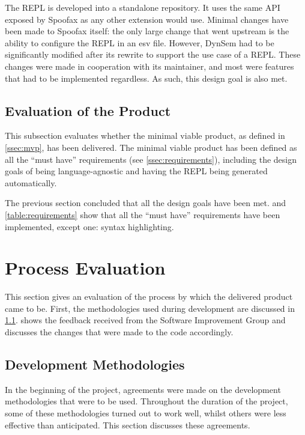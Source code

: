 The REPL is developed into a standalone repository. It uses the same API exposed
by Spoofax as any other extension would use. Minimal changes have been made to
Spoofax itself: the only large change that went upstream is the ability to
configure the REPL in an esv file. However, DynSem had to be significantly
modified after its rewrite to support the use case of a REPL. These changes were
made in cooperation with its maintainer, and most were features that had to be
implemented regardless. As such, this design goal is also met.

\subsection{Evaluation of the Product}
\label{ssec:eval-product}

This subsection evaluates whether the minimal viable product, as defined in
\cref{ssec:mvp}, has been delivered. The minimal viable product has been defined
as all the ``must have'' requirements (see \cref{ssec:requirements}), including
the design goals of being language-agnostic and having the REPL being generated
automatically.

The previous section concluded that all the design goals have been met.
 and \cref{table:requirements} show that all the
``must have'' requirements have been implemented, except one: syntax
highlighting.


\section{Process Evaluation}
\label{sec:process-evaluation}

This section gives an evaluation of the process by which the delivered product
came to be. First, the methodologies used during development are discussed in
\cref{ssec:dev-meth}.  shows the feedback received from the
Software Improvement Group and discusses the changes that were made to the code
accordingly.

\subsection{Development Methodologies}
\label{ssec:dev-meth}

In the beginning of the project, agreements were made on the development
methodologies that were to be used. Throughout the duration of the project, some
of these methodologies turned out to work well, whilst others were less
effective than anticipated. This section discusses these agreements.

